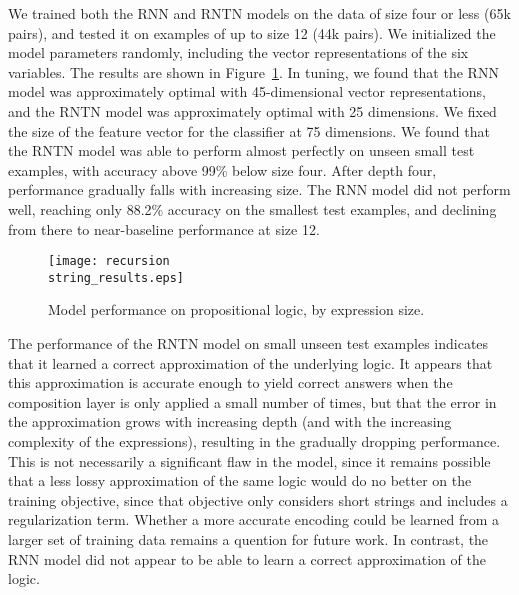 We trained both the RNN and RNTN models on the data of size four or
less (65k pairs), and tested it on examples of up to size 12 (44k
pairs). We initialized the model parameters randomly, including the
vector representations of the six variables. The results are shown in
Figure~\ref{prop-results}. In tuning, we found that the RNN model was
approximately optimal with 45-dimensional vector representations, and
the RNTN model was approximately optimal with 25 dimensions. We fixed
the size of the feature vector for the classifier at 75 dimensions. We
found that the RNTN model was able to perform almost perfectly on
unseen small test examples, with accuracy above 99\% below size four.
After depth four, performance gradually falls with increasing size.
The RNN model did not perform well, reaching only 88.2\% accuracy on
the smallest test examples, and declining from there to near-baseline
performance at size 12.

\begin{figure}[htp]
  \centering
  \texttt{[image: recursion\\string\_results.eps]}
  \caption{Model performance on propositional logic, by expression size.}  
  \label{prop-results}
\end{figure}

The performance of the RNTN model on small unseen test examples
indicates that it learned a correct approximation of the underlying
logic. It appears that this approximation is accurate enough to yield
correct answers when the composition layer is only applied a small
number of times, but that the error in the approximation grows with
increasing depth (and with the increasing complexity of the expressions),
 resulting in the gradually dropping performance. This is not
necessarily a significant flaw in the model, since it remains possible
that a less lossy approximation of the same logic would do no better
on the training objective, since that objective only considers short
strings and includes a regularization term. Whether a more accurate
encoding could be learned from a larger set of training data remains a
quention for future work. In contrast, the RNN model did not appear to
be able to learn a correct approximation of the logic.


